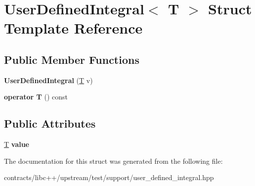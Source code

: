 \hypertarget{struct_user_defined_integral}{}\section{User\+Defined\+Integral$<$ T $>$ Struct Template Reference}
\label{struct_user_defined_integral}
\subsection*{Public Member Functions}
\begin{DoxyCompactItemize}
\item 
\mbox{\label{struct_user_defined_integral_a8463af122f5d019433b47a31ca057219}} 
{\bfseries User\+Defined\+Integral} (\mbox{\hyperlink{struct_t}{T}} v)
\item 
\mbox{\label{struct_user_defined_integral_aa8a6e179ace425cbb2360a8723a1b25b}} 
{\bfseries operator T} () const
\end{DoxyCompactItemize}
\subsection*{Public Attributes}
\begin{DoxyCompactItemize}
\item 
\mbox{\label{struct_user_defined_integral_ad9380197a616eeceff3952feb469bd58}} 
\mbox{\hyperlink{struct_t}{T}} {\bfseries value}
\end{DoxyCompactItemize}


The documentation for this struct was generated from the following file\+:\begin{DoxyCompactItemize}
\item 
contracts/libc++/upstream/test/support/user\+\_\+defined\+\_\+integral.\+hpp\end{DoxyCompactItemize}
